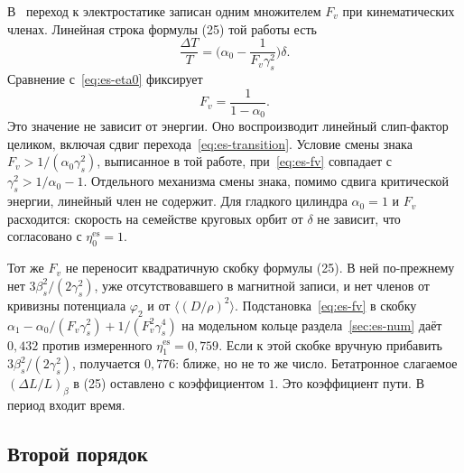 \documentclass[aps,pra,preprint,a4paper,amsmath,amssymb,longbibliography]{revtex4-2}
\begin{document}
В~\cite{Senichev2013} переход к электростатике записан одним множителем $F_v$ при кинематических членах. Линейная строка формулы (25) той работы есть
\begin{equation}
\label{eq:es-sen25}
\frac{\Delta T}{T}
=\Biggl(\alpha_0-\frac{1}{F_v\gamma_s^2}\Biggr)\delta.
\end{equation}
Сравнение с~\eqref{eq:es-eta0} фиксирует
\begin{equation}
\label{eq:es-fv}
F_v=\frac{1}{1-\alpha_0}.
\end{equation}
Это значение не зависит от энергии. Оно воспроизводит линейный слип-фактор целиком, включая сдвиг перехода~\eqref{eq:es-transition}. Условие смены знака $F_v>1/(\alpha_0\gamma_s^2)$, выписанное в той работе, при~\eqref{eq:es-fv} совпадает с $\gamma_s^2>1/\alpha_0-1$. Отдельного механизма смены знака, помимо сдвига критической энергии, линейный член не содержит. Для гладкого цилиндра $\alpha_0=1$ и $F_v$ расходится: скорость на семействе круговых орбит от $\delta$ не зависит, что согласовано с $\eta_0^{\mathrm{es}}=1$.

Тот же $F_v$ не переносит квадратичную скобку формулы (25). В ней по-прежнему нет $3\beta_s^2/(2\gamma_s^2)$, уже отсутствовавшего в магнитной записи, и нет членов от кривизны потенциала $\varphi_2$ и от $\langle(D/\rho)^2\rangle$. Подстановка~\eqref{eq:es-fv} в скобку $\alpha_1-\alpha_0/(F_v\gamma_s^2)+1/(F_v^2\gamma_s^4)$ на модельном кольце раздела~\ref{sec:es-num} даёт $0{,}432$ против измеренного $\eta_1^{\mathrm{es}}=0{,}759$. Если к этой скобке вручную прибавить $3\beta_s^2/(2\gamma_s^2)$, получается $0{,}776$: ближе, но не то же число. Бетатронное слагаемое $(\Delta L/L)_\beta$ в (25) оставлено с коэффициентом $1$. Это коэффициент пути. В период входит время.

\subsection{Второй порядок}
\label{sec:es-eta1}
\end{document}
